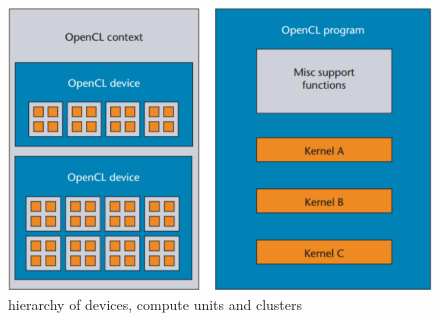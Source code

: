 \documentclass[a4paper, 11pt]{report}
\begin{document}




\begin{figure}[ht]
\centering
\includegraphics[scale=0.7]{images/OpenCLDevices.pdf}
\caption{hierarchy of devices, compute units and clusters}\label{fig:OpenCLDevices}
\end{figure}
\end{document}
